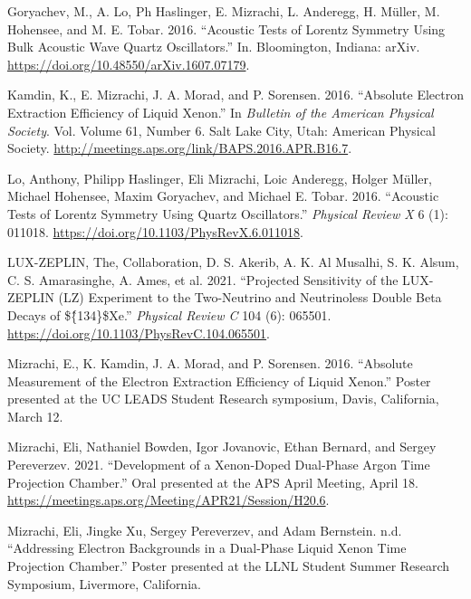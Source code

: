 \documentclass[
  10pt,
  letterpaper,
  DIV=11,
  numbers=noendperiod]{scrartcl}
\newlength{\cslhangindent}
\newlength{\cslentryspacingunit} %
\newenvironment{CSLReferences}[2] %
 {%
  \setlength{\parindent}{0pt}
  \ifodd #1
  \let\oldpar\par
  \def\par{\hangindent=\cslhangindent\oldpar}
  \fi
  \setlength{\parskip}{#2\cslentryspacingunit}
 }%
 {}
\begin{document}
\begin{CSLReferences}{1}{0}
\leavevmode{}%
Goryachev, M., A. Lo, Ph Haslinger, E. Mizrachi, L. Anderegg, H. Müller,
M. Hohensee, and M. E. Tobar. 2016. {``Acoustic Tests of {Lorentz}
Symmetry Using {Bulk Acoustic Wave} Quartz Oscillators.''} In.
{Bloomington, Indiana}: {arXiv}.
\url{https://doi.org/10.48550/arXiv.1607.07179}.

\leavevmode{}%
Kamdin, K., E. Mizrachi, J. A. Morad, and P. Sorensen. 2016. {``Absolute
{Electron Extraction Efficiency} of {Liquid Xenon}.''} In \emph{Bulletin
of the {American Physical Society}}. Vol. Volume 61, Number 6. {Salt
Lake City, Utah}: {American Physical Society}.
\url{http://meetings.aps.org/link/BAPS.2016.APR.B16.7}.

\leavevmode{}%
Lo, Anthony, Philipp Haslinger, Eli Mizrachi, Loic Anderegg, Holger
Müller, Michael Hohensee, Maxim Goryachev, and Michael E. Tobar. 2016.
{``Acoustic Tests of {Lorentz} Symmetry Using Quartz Oscillators.''}
\emph{Physical Review X} 6 (1): 011018.
\url{https://doi.org/10.1103/PhysRevX.6.011018}.

\leavevmode{}%
LUX-ZEPLIN, The, Collaboration, D. S. Akerib, A. K. Al Musalhi, S. K.
Alsum, C. S. Amarasinghe, A. Ames, et al. 2021. {``Projected Sensitivity
of the {LUX-ZEPLIN} ({LZ}) Experiment to the Two-Neutrino and
Neutrinoless Double Beta Decays of \$\{̂134\}\${Xe}.''} \emph{Physical
Review C} 104 (6): 065501.
\url{https://doi.org/10.1103/PhysRevC.104.065501}.

\leavevmode{}%
Mizrachi, E., K. Kamdin, J. A. Morad, and P. Sorensen. 2016. {``Absolute
{Measurement} of the {Electron Extraction Efficiency} of {Liquid
Xenon}.''} Poster presented at the {UC LEADS Student Research}
symposium, {Davis, California}, March 12.

\leavevmode{}%
Mizrachi, Eli, Nathaniel Bowden, Igor Jovanovic, Ethan Bernard, and
Sergey Pereverzev. 2021. {``Development of a {Xenon-Doped Dual-Phase
Argon Time Projection Chamber}.''} Oral presented at the {APS April
Meeting}, April 18.
\url{https://meetings.aps.org/Meeting/APR21/Session/H20.6}.

\leavevmode{}%
Mizrachi, Eli, Jingke Xu, Sergey Pereverzev, and Adam Bernstein. n.d.
{``Addressing {Electron Backgrounds} in a {Dual-Phase Liquid Xenon Time
Projection Chamber}.''} Poster presented at the {LLNL Student Summer
Research Symposium}, {Livermore, California}.


\end{CSLReferences}
\end{document}
